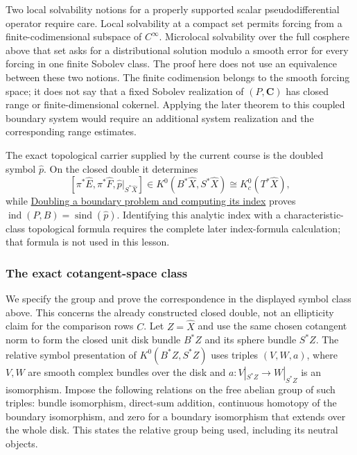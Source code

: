 \documentclass[
  11pt,
]{article}
\begin{document}
Two local solvability notions for a properly supported scalar
pseudodifferential operator require care. Local solvability at a compact
set permits forcing from a finite-codimensional subspace of
\(C^\infty\). Microlocal solvability over the full cosphere above that
set asks for a distributional solution modulo a smooth error for every
forcing in one finite Sobolev class. The proof here does not use an
equivalence between these two notions. The finite codimension belongs to
the smooth forcing space; it does not say that a fixed Sobolev
realization of \((P,\mathbf C)\) has closed range or finite-dimensional
cokernel. Applying the later theorem to this coupled boundary system
would require an additional system realization and the corresponding
range estimates.

The exact topological carrier supplied by the current course is the
doubled symbol \(\widehat p\). On the closed double it determines \[
 [\pi^*\widehat E,\pi^*\widehat F,
   \widehat p|_{S^*\widehat X}]
 \in K^0(B^*\widehat X,S^*\widehat X)
 \cong K_c^0(T^*\widehat X),
\] while \href{split-doubling-boundary-index.pdf}{Doubling a boundary
problem and computing its index} proves
\(\operatorname{ind}(P,B)=\operatorname{sind}(\widehat p)\). Identifying
this analytic index with a characteristic-class topological formula
requires the complete later index-formula calculation; that formula is
not used in this lesson.

\subsubsection{The exact cotangent-space
class}\label{the-exact-cotangent-space-class}

We specify the group and prove the correspondence in the displayed
symbol class above. This concerns the already constructed closed double,
not an ellipticity claim for the comparison rows \(C\). Let
\(Z=\widehat X\) and use the same chosen cotangent norm to form the
closed unit disk bundle \(B^*Z\) and its sphere bundle \(S^*Z\). The
relative symbol presentation of \(K^0(B^*Z,S^*Z)\) uses triples
\((V,W,a)\), where \(V,W\) are smooth complex bundles over the disk and
\(a:V|_{S^*Z}\to W|_{S^*Z}\) is an isomorphism. Impose the following
relations on the free abelian group of such triples: bundle isomorphism,
direct-sum addition, continuous homotopy of the boundary isomorphism,
and zero for a boundary isomorphism that extends over the whole disk.
This states the relative group being used, including its neutral
objects.
\end{document}
